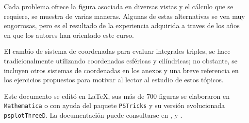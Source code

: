 Cada problema ofrece la figura asociada en diversas vistas y el cálculo que se requiere, se muestra de varias maneras.
Algunas de estas alternativas se ven muy engorrosas, pero es el resultado de la experiencia adquirida a traves de los años
en que los autores han orientado este curso.

El cambio de sistema de coordenadas para evaluar integrales triples, se hace tradicionalmente utilizando coordenadas esféricas y cilíndricas; no obstante, se incluyen otros sistemas de coordenadas en los anexos y una breve referencia en los ejercicios propuestos para motivar al lector al estudio de estos tópicos.

Este documento se editó en \LaTeX, sus más de 700 figuras se elaboraron en \verb"Mathematica" o con ayuda del paquete \verb"PSTricks" y su versión evolucionada \verb"psplotThreeD". La documentación puede consultarse en \textcite{vignault_pst-solides3d_2023}, \textcite{van_zandt_pst-plot_2016} y \textcite{vos_pst-func_2024}.

\begin{flushright}
\end{flushright}

\newpage